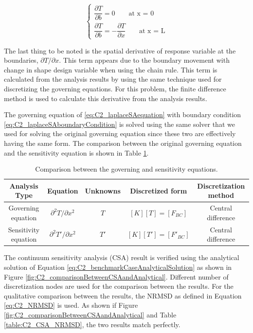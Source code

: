 \begin{equation}\label{eq:C2_laplaceSAboundaryCondition}
\begin{cases}
	\dfrac{\partial T}{\partial b} = 0 \qquad \text{at x = 0}
	\\
	\dfrac{\partial T}{\partial b} = -\dfrac{\partial T}{\partial x} \qquad \text{at x = L}
\end{cases}
\end{equation}

The last thing to be noted is the spatial derivative of response variable at the boundaries, $\partial T/\partial x$. This term appears due to the boundary movement with change in shape design variable when using the chain rule. This term is calculated from the analysis results by using the same technique used for discretizing the governing equations. For this problem, the finite difference method is used to calculate this derivative from the analysis results.

The governing equation of \eqref{eq:C2_laplaceSAequation} with boundary condition \eqref{eq:C2_laplaceSAboundaryCondition} is solved using the same solver that we used for solving the original governing equation since these two are effectively having the same form. The comparison between the original governing equation and the sensitivity equation is shown in Table \ref{table:C2_comparisonBetweenGEandSA}.

\begin{center}
\begin{table}[h]
\begin{tabular}{| c | c | c | c | c |}
	\hline
	Analysis Type & Equation & Unknowns & Discretized form & Discretization method \\ \hline \hline
	Governing equation & $\partial^2 T/\partial x^2$ & $T$ & $[K][T] = [F_{BC}]$ & Central difference \\ \hline
	Sensitivity equation & $\partial^2 T'/\partial x^2$ & $T'$ & $[K][T'] = [F'_{BC}]$ & Central difference \\ \hline
\end{tabular}
\caption{Comparison between the governing and sensitivity equations.}
\label{table:C2_comparisonBetweenGEandSA}
\end{table}
\end{center}

The continuum sensitivity analysis (CSA) result is verified using the analytical solution of Equation \eqref{eq:C2_benchmarkCaseAnalyticalSolution} as shown in Figure \ref{fig:C2_comparisonBetweenCSAandAnalytical}. Different number of discretization nodes are used for the comparison between the results. For the qualitative comparison between the results, the NRMSD as defined in Equation \eqref{eq:C2_NRMSD} is used. As shown if Figure \ref{fig:C2_comparisonBetweenCSAandAnalytical} and Table \ref{table:C2_CSA_NRMSD}, the two results match perfectly.

